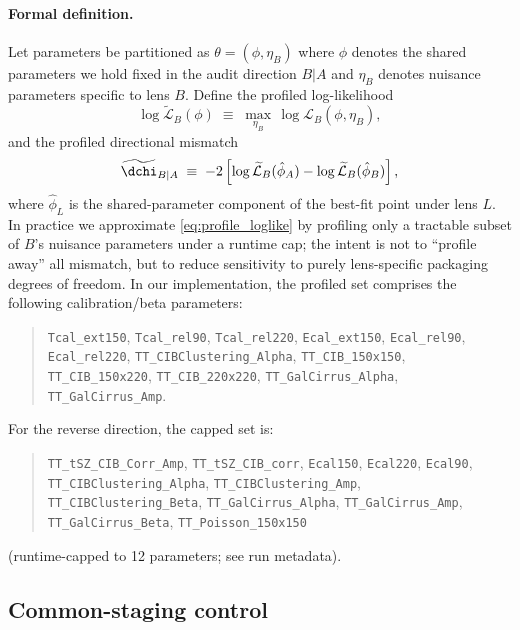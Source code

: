\paragraph{Formal definition.}
Let parameters be partitioned as $\theta=(\phi,\eta_B)$ where $\phi$ denotes the shared parameters we hold fixed in the audit direction $B|A$ and $\eta_B$ denotes nuisance parameters specific to lens $B$. Define the profiled log-likelihood
\begin{equation}
  \log \widetilde{\mathcal{L}}_B(\phi) \;\equiv\; \max_{\eta_B}\, \log \mathcal{L}_B(\phi,\eta_B),
  \label{eq:profile_loglike}
\end{equation}
and the profiled directional mismatch
\begin{equation}
  \widetilde{\dchi}_{B|A} \;\equiv\; -2\left[\log \widetilde{\mathcal{L}}_B(\hat\phi_A) - \log \widetilde{\mathcal{L}}_B(\hat\phi_B)\right],
  \label{eq:profile_dchi}
\end{equation}
where $\hat\phi_L$ is the shared-parameter component of the best-fit point under lens $L$.
In practice we approximate \cref{eq:profile_loglike} by profiling only a tractable subset of $B$'s nuisance parameters under a runtime cap; the intent is not to ``profile away'' all mismatch, but to reduce sensitivity to purely lens-specific packaging degrees of freedom.
In our implementation, the profiled set comprises the following calibration/beta parameters:
\begin{quote}\small\raggedright
\texttt{Tcal\_ext150},
\texttt{Tcal\_rel90},
\texttt{Tcal\_rel220},
\texttt{Ecal\_ext150},
\texttt{Ecal\_rel90},
\texttt{Ecal\_rel220},
\texttt{TT\_CIBClustering\_Alpha},
\texttt{TT\_CIB\_150x150},
\texttt{TT\_CIB\_150x220},
\texttt{TT\_CIB\_220x220},
\texttt{TT\_GalCirrus\_Alpha},
\texttt{TT\_GalCirrus\_Amp}.
\end{quote}
\noindent For the reverse direction, the capped set is:
\begin{quote}\small\raggedright
\texttt{TT\_tSZ\_CIB\_Corr\_Amp},
\texttt{TT\_tSZ\_CIB\_corr},
\texttt{Ecal150},
\texttt{Ecal220},
\texttt{Ecal90},
\texttt{TT\_CIBClustering\_Alpha},
\texttt{TT\_CIBClustering\_Amp},
\texttt{TT\_CIBClustering\_Beta},
\texttt{TT\_GalCirrus\_Alpha},
\texttt{TT\_GalCirrus\_Amp},
\texttt{TT\_GalCirrus\_Beta},
\texttt{TT\_Poisson\_150x150}
\end{quote}
\noindent (runtime-capped to 12 parameters; see run metadata).

\subsection{Common-staging control}
\label{sec:common-staging}

